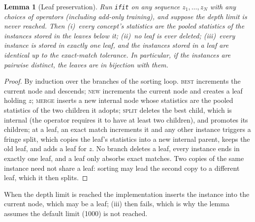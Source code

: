 \documentclass[11pt]{article}
\newtheorem{lemma}[theorem]{Lemma}
\theoremstyle{definition}
\theoremstyle{remark}
\begin{document}
\begin{lemma}[Leaf preservation]\label{lem:leaves}
Run \texttt{ifit} on any sequence $z_1,\dots,z_N$ with any choices of operators
(including add-only training), and suppose the depth limit is never reached.  Then
(i)~every concept's statistics are the pooled statistics of the instances stored in the
leaves below it; (ii)~no leaf is ever deleted; (iii)~every instance is stored in exactly
one leaf, and the instances stored in a leaf are identical up to the exact-match
tolerance.  In particular, if the instances are pairwise distinct, the leaves are in
bijection with them.
\end{lemma}
\begin{proof}
By induction over the branches of the sorting loop.  \textsc{best} increments the
current node and descends; \textsc{new} increments the current node and creates a leaf
holding $z$; \textsc{merge} inserts a new internal node whose statistics are the pooled
statistics of the two children it adopts; \textsc{split} deletes the best child, which is
internal (the operator requires it to have at least two children), and promotes its
children; at a leaf, an exact match increments it and any other instance triggers a
fringe split, which copies the leaf's statistics into a new internal parent, keeps the
old leaf, and adds a leaf for $z$.  No branch deletes a leaf, every instance ends in
exactly one leaf, and a leaf only absorbs exact matches.  Two copies of the same
instance need not share a leaf: sorting may lead the second copy to a different leaf,
which it then splits.
\end{proof}

When the depth limit is reached the implementation inserts the instance into the
current node, which may be a leaf; (iii) then fails, which is why the lemma assumes the
default limit (1000) is not reached.
\end{document}
